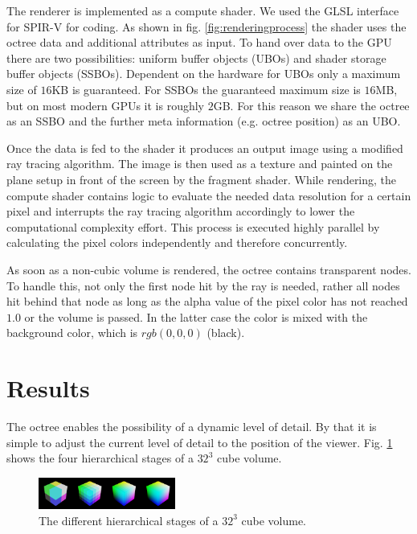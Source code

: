 \documentclass[12pt,conference]{IEEEtran}
\begin{document}
The renderer is implemented as a compute shader. We used the GLSL interface for SPIR-V for coding. As shown in fig. \ref{fig:renderingprocess} the shader uses the octree data and additional attributes as input. To hand over data to the GPU there are two possibilities: uniform buffer objects (UBOs) and shader storage buffer objects (SSBOs)\cite{vulkan1.0.38spec}. Dependent on the hardware for UBOs only a maximum size of $16$KB is guaranteed. For SSBOs the guaranteed maximum size is $16$MB, but on most modern GPUs it is roughly $2$GB\cite{willems2016vulkan}. For this reason we share the octree as an SSBO and the further meta information (e.g. octree position) as an UBO.
\par
Once the data is fed to the shader it produces an output image using a modified ray tracing algorithm. The image is then used as a texture and painted on the plane setup in front of the screen by the fragment shader. While rendering, the compute shader contains logic to evaluate the needed data resolution for a certain pixel and interrupts the ray tracing algorithm accordingly to lower the computational complexity effort. This process is executed highly parallel by calculating the pixel colors independently and therefore concurrently.

As soon as a non-cubic volume is rendered, the octree contains transparent nodes. To handle this, not only the first node hit by the ray is needed, rather all nodes hit behind that node as long as the alpha value of the pixel color has not reached $1.0$ or the volume is passed. In the latter case the color is mixed with the background color, which is $rgb(0, 0, 0)$ (black).


\section{Results}
\label{results}
The octree enables the possibility of a dynamic level of detail. By that it is simple to adjust the current level of detail to the position of the viewer. Fig. \ref{fig:hierarchiesCube} shows the four hierarchical stages of a $32^3$ cube volume. 
\begin{figure}[htp]
	\centering
	\includegraphics[width=0.4\textwidth]{images/cube_hierarchy.png}
	\caption{The different hierarchical stages of a $32^3$ cube volume.}
	\label{fig:hierarchiesCube}
\end{figure}
\end{document}

